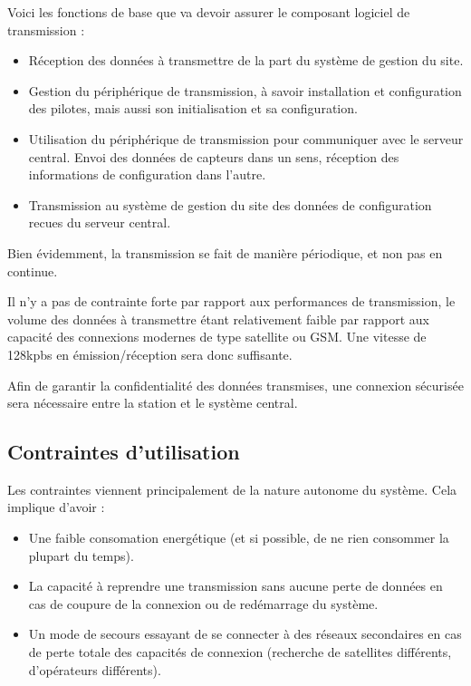 Voici les fonctions de base que va devoir assurer le composant logiciel de transmission :

\begin{itemize}
\item Réception des données à transmettre de la part du système de gestion du site.
\item Gestion du périphérique de transmission, à savoir installation et configuration des pilotes, mais aussi son initialisation et sa configuration.
\item Utilisation du périphérique de transmission pour communiquer avec le serveur central. Envoi des données de capteurs dans un sens, réception des informations de configuration dans l'autre.
\item Transmission au système de gestion du site des données de configuration recues du serveur central.
\end{itemize}

Bien évidemment, la transmission se fait de manière périodique, et non pas en continue.

Il n'y a pas de contrainte forte par rapport aux performances de transmission, le volume des données à transmettre étant relativement faible par rapport aux capacité des connexions modernes de type satellite ou GSM. Une vitesse de 128kpbs en émission/réception sera donc suffisante.

Afin de garantir la confidentialité des données transmises, une connexion sécurisée sera nécessaire entre la station et le système central.

\subsection{Contraintes d'utilisation}

Les contraintes viennent principalement de la nature autonome du système. Cela implique d'avoir :

\begin{itemize}
\item Une faible consomation energétique (et si possible, de ne rien consommer la plupart du temps).
\item La capacité à reprendre une transmission sans aucune perte de données en cas de coupure de la connexion ou de redémarrage du système.
\item Un mode de secours essayant de se connecter à des réseaux secondaires en cas de perte totale des capacités de connexion (recherche de satellites différents, d'opérateurs différents).
\end{itemize}

